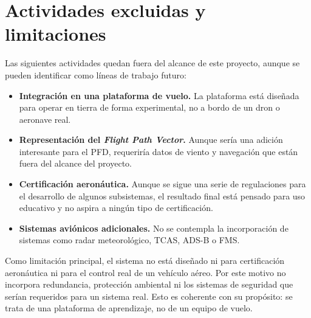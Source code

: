 \section{Actividades excluidas y limitaciones}
\label{sec:exclusiones}

Las siguientes actividades quedan fuera del alcance de este proyecto, aunque se
pueden identificar como líneas de trabajo futuro:

\begin{itemize}
    \item \textbf{Integración en una plataforma de vuelo.} La plataforma está
    diseñada para operar en tierra de forma experimental, no a bordo de un dron
    o aeronave real.

    \item \textbf{Representación del \textit{Flight Path Vector}.} Aunque sería una
    adición interesante para el PFD, requeriría datos de viento y navegación
    que están fuera del alcance del proyecto.

    \item \textbf{Certificación aeronáutica.} Aunque se sigue una serie de regulaciones
    para el desarrollo de algunos subsistemas, el resultado final está pensado
    para uso educativo y no aspira a ningún tipo de certificación.

    \item \textbf{Sistemas aviónicos adicionales.} No se contempla la incorporación
    de sistemas como radar meteorológico, TCAS, ADS-B o FMS.
\end{itemize}

Como limitación principal, el sistema no está diseñado ni para certificación
aeronáutica ni para el control real de un vehículo aéreo. Por este motivo no
incorpora redundancia, protección ambiental ni los sistemas de seguridad que
serían requeridos para un sistema real. Esto es coherente con su propósito: se
trata de una plataforma de aprendizaje, no de un equipo de vuelo.